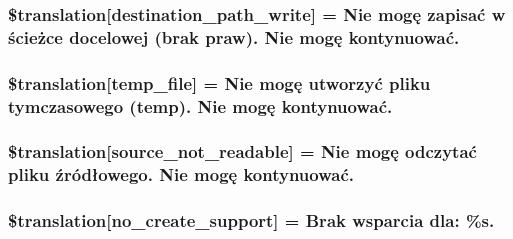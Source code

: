 \subsubsection[{\$translation}]{\setlength{\rightskip}{0pt plus 5cm}\$translation\mbox{[}\textquotesingle{}destination\+\_\+path\+\_\+write\textquotesingle{}\mbox{]} = \textquotesingle{}Nie mogę zapisać w ścieżce docelowej (brak praw). Nie mogę kontynuować.\textquotesingle{}}\label{class_8upload_8pl___p_l_8php_a40e4e1962226b89fd76da5819a9602b0}
\hypertarget{class_8upload_8pl___p_l_8php_a2baece8da11e20d45175db91851ec3e3}{}
\subsubsection[{\$translation}]{\setlength{\rightskip}{0pt plus 5cm}\$translation\mbox{[}\textquotesingle{}temp\+\_\+file\textquotesingle{}\mbox{]} = \textquotesingle{}Nie mogę utworzyć pliku tymczasowego (temp). Nie mogę kontynuować.\textquotesingle{}}\label{class_8upload_8pl___p_l_8php_a2baece8da11e20d45175db91851ec3e3}
\hypertarget{class_8upload_8pl___p_l_8php_a922967ca2df0efdd455261142d8e5715}{}
\subsubsection[{\$translation}]{\setlength{\rightskip}{0pt plus 5cm}\$translation\mbox{[}\textquotesingle{}source\+\_\+not\+\_\+readable\textquotesingle{}\mbox{]} = \textquotesingle{}Nie mogę odczytać pliku źródłowego. Nie mogę kontynuować.\textquotesingle{}}\label{class_8upload_8pl___p_l_8php_a922967ca2df0efdd455261142d8e5715}
\hypertarget{class_8upload_8pl___p_l_8php_a346dfd1ade29f583dd20d345c436859f}{}
\subsubsection[{\$translation}]{\setlength{\rightskip}{0pt plus 5cm}\$translation\mbox{[}\textquotesingle{}no\+\_\+create\+\_\+support\textquotesingle{}\mbox{]} = \textquotesingle{}Brak wsparcia dla\+: \%s.\textquotesingle{}}\label{class_8upload_8pl___p_l_8php_a346dfd1ade29f583dd20d345c436859f}
\hypertarget{class_8upload_8pl___p_l_8php_a53013ce9255c4e1849098ddd9fdb2b3f}{}
